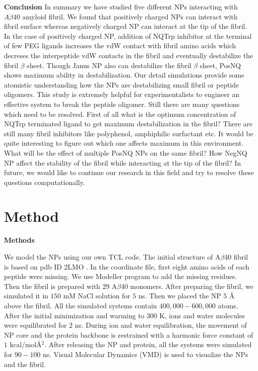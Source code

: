 \documentclass[journal=jacsat,manuscript=communication]{achemso}
\begin{document}
\textbf{Conclusion} In summary we have studied five different NPs interacting
with $A\beta40$ amyloid fibril. We found that positively charged NPs can
interact with fibril surface whereas negatively charged NP can interact at the
tip of the fibril.  In the case of positively charged NP, addition of NQTrp
inhibitor at the terminal of few PEG ligands increases the vdW contact with
fibril amino acids which decreses the interpeptide vdW contacts in the fibril
and eventually destabilize the fibril $\beta$ sheet. Though Janus NP also can
destabilize the fibril $\beta$ sheet, PosNQ shows maximum ability in
destabilization. Our detail simulations provide some atomistic understanding how
the NPs are destabilizing small fibril or peptide oligomers. This study is
extremely helpful for experimentalists to engineer an effective system to break
the peptide oligomer. Still there are many questions which need to be resolved.
First of all what is the optimum concentration of NQTrp terminated ligand to get
maximum destabilization in the fibril? There are still many fibril inhibitors
like polyphenol, amphiphilic surfactant etc. It would be quite interesting to
figure out which one affects maximum in this environment.  What will be the
effect of multiple PosNQ NPs on the same fibril?  How NegNQ NP affect the
stability of the fibril while interacting at the tip of the fibril?  In future,
we would like to continue our research in this field and try to resolve these
questions computationally. 



\section{Method}

\textbf{Methods}

We model the NPs using our own TCL code. The initial structure of A$\beta$40
fibril is based on pdb ID 2LMO \cite{Petkova2006}. In the coordinate file, first
eight amino acids of each peptide were missing. We use Modeller program
\cite{Sali1993,Fiser2000} to add the missing residues.  Then the fibril is
prepared with $29$ A$\beta$40 monomers. After preparing the fibril, we simulated
it in $150$ mM NaCl solution for $5$ ns. Then we placed the NP $5$ {\AA} above
the fibril. All the simulated systems contain $400,000-600,000$ atoms. After the
initial minimization and warming to $300$ K, ions and water molecules were
equilibrated for $2$ ns. During ion and water equilibration, the movement of NP
core and the protein backbone is restrained with a harmonic force constant of
$1$ kcal/mol{\AA}$^{2}$. After releasing the NP and protein, all the systems
were simulated for $90-100$ ns. Visual Molecular Dynamics (VMD)
\cite{Humphrey1996} is used to visualize the NPs and the fibril. 
\end{document}
